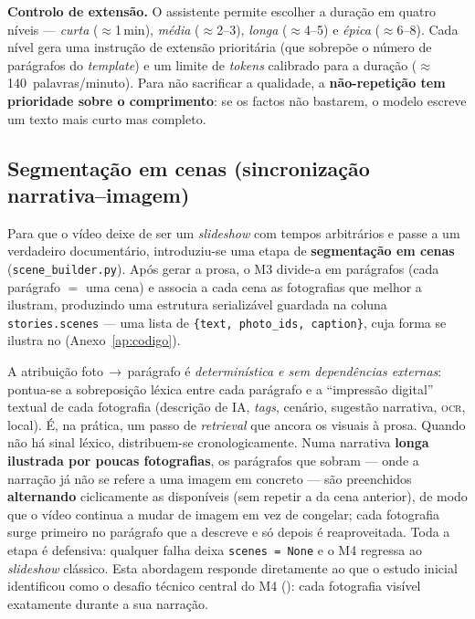 \textbf{Controlo de extensão.} O assistente permite escolher a duração em
quatro níveis --- \emph{curta} ($\approx$1\,min), \emph{média}
($\approx$2--3), \emph{longa} ($\approx$4--5) e \emph{épica}
($\approx$6--8). Cada nível gera uma instrução de extensão prioritária (que
sobrepõe o número de parágrafos do \emph{template}) e um limite de
\emph{tokens} calibrado para a duração ($\approx$140~palavras/minuto). Para
não sacrificar a qualidade, a \textbf{não-repetição tem prioridade sobre o
comprimento}: se os factos não bastarem, o modelo escreve um texto mais
curto mas completo.

\subsection{Segmentação em cenas (sincronização narrativa--imagem)}
\label{sub:cenas}

Para que o vídeo deixe de ser um \emph{slideshow} com tempos arbitrários
e passe a um verdadeiro documentário, introduziu-se uma etapa de
\textbf{segmentação em cenas} (\texttt{scene\_builder.py}). Após gerar a
prosa, o M3 divide-a em parágrafos (cada parágrafo $=$ uma cena) e
associa a cada cena as fotografias que melhor a ilustram, produzindo uma
estrutura serializável guardada na coluna \texttt{stories.scenes} --- uma
lista de \texttt{\{text, photo\_ids, caption\}}, cuja forma se ilustra no
 (Anexo~\ref{ap:codigo}).

A atribuição foto\,$\rightarrow$\,parágrafo é \emph{determinística e sem
dependências externas}: pontua-se a sobreposição léxica entre cada
parágrafo e a ``impressão digital'' textual de cada fotografia (descrição
de IA, \emph{tags}, cenário, sugestão narrativa, \textsc{ocr}, local). É,
na prática, um passo de \emph{retrieval} que ancora os visuais à prosa.
Quando não há sinal léxico, distribuem-se cronologicamente. Numa narrativa
\textbf{longa ilustrada por poucas fotografias}, os parágrafos que sobram
--- onde a narração já não se refere a uma imagem em concreto --- são
preenchidos \textbf{alternando} ciclicamente as disponíveis (sem repetir a
da cena anterior), de modo que o vídeo continua a mudar de imagem em vez de
congelar; cada fotografia surge primeiro no parágrafo que a descreve e só
depois é reaproveitada. Toda a etapa é
defensiva: qualquer falha deixa \texttt{scenes\,=\,None} e o M4 regressa ao
\emph{slideshow} clássico. Esta abordagem responde diretamente ao que o
estudo inicial identificou como o desafio técnico central do M4
(): cada fotografia visível exatamente durante a
sua narração.

